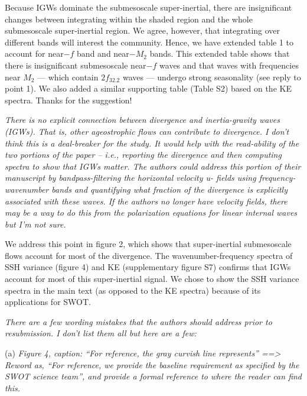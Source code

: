 \documentclass[11pt]{article}
\newcommand{\bdp}{\begin{description}}
\newcommand{\edp}{\end{description}}
\begin{document}
\begin{enumerate}
\bdp
\item \noindent Because IGWs dominate the submesoscale super-inertial, there are insignificant
changes between integrating within the shaded region and the whole submesoscale
super-inertial region. We agree, however, that integrating over different bands
will interest the community. Hence, we have extended table 1 to account for near$-f$
band and near$-M_2$ bands. This extended table shows that there is insignificant
submesoscale near$-f$ waves and that waves with frequencies near $M_2$ — which contain
$2f_{32.2}$ waves — undergo strong seasonality (see reply to point 1). We also added
a similar supporting table (Table S2) based on the KE spectra. Thanks for the suggestion!
\edp


\item {\it There is no explicit connection between divergence and inertia-gravity waves (IGWs). That
is, other ageostrophic flows can contribute to divergence. I don’t think this is a deal-breaker
for the study. It would help with the read-ability of the two portions of the paper – i.e.,
reporting the divergence and then computing spectra to show that IGWs matter. The authors
could address this portion of their manuscript by bandpass-filtering the horizontal velocity u-
fields using frequency-wavenumber bands and quantifying what fraction of the divergence is
explicitly associated with these waves. If the authors no longer have velocity fields, there may
be a way to do this from the polarization equations for linear internal waves but I’m not sure.}

\bdp
\item {\noindent
We address this point in figure 2, which shows that super-inertial submesoscale
flows account for most of the divergence. The wavenumber-frequency spectra of SSH
variance (figure 4) and KE (supplementary figure S7) confirms that IGWs account
for most of this super-inertial signal. We chose to show the SSH variance spectra
in the main text (as opposed to the KE spectra) because of its applications for SWOT.
}
\edp


\item{\it  There are a few wording mistakes that the authors should address prior to resubmission. I
don’t list them all but here are a few:}

  \subitem (a) {\it Figure 4, caption: “For reference, the gray curvish line represents” ==> Reword as,
  “For reference, we provide the baseline requirement as specified by the SWOT
  science team”, and provide a formal reference to where the reader can find this.}


\end{enumerate}
\end{document}
